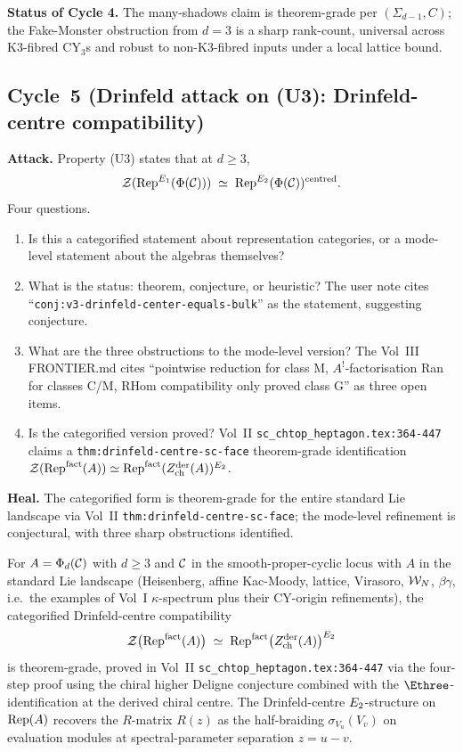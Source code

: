 \medskip
\noindent\textbf{Status of Cycle 4.} The many-shadows claim is theorem-grade
per $(\Sigma_{d-1}, C)$; the Fake-Monster obstruction from $d = 3$ is a
sharp rank-count, universal across K3-fibred CY$_3$s and robust to
non-K3-fibred inputs under a local lattice bound.

\subsection*{Cycle~5 (Drinfeld attack on (U3): Drinfeld-centre compatibility)}

\textbf{Attack.} Property (U3) states that at $d \ge 3$,
\[
  \mathcal{Z}(\mathrm{Rep}^{E_1}(\Phi(\mathcal{C}))) \;\simeq\; \mathrm{Rep}^{E_2}(\Phi(\mathcal{C}))^{\mathrm{centred}}.
\]
Four questions.
\begin{enumerate}
\item[Q1.] Is this a categorified statement about representation
categories, or a mode-level statement about the algebras themselves?
\item[Q2.] What is the status: theorem, conjecture, or heuristic? The
user note cites ``\texttt{conj:v3-drinfeld-center-equals-bulk}'' as the
statement, suggesting conjecture.
\item[Q3.] What are the three obstructions to the mode-level version?
The Vol~III FRONTIER.md cites ``pointwise reduction for class M,
$A^!$-factorisation Ran for classes C/M, RHom compatibility only proved
class G'' as three open items.
\item[Q4.] Is the categorified version proved? Vol~II
\texttt{sc\_chtop\_heptagon.tex:364-447} claims a
\texttt{thm:drinfeld-centre-sc-face} theorem-grade identification
$\mathcal{Z}(\mathrm{Rep}^{\mathrm{fact}}(A)) \simeq \mathrm{Rep}^{\mathrm{fact}}(Z^{\mathrm{der}}_{\mathrm{ch}}(A))^{E_2}$.
\end{enumerate}

\textbf{Heal.} The categorified form is theorem-grade for the entire
standard Lie landscape via Vol~II \texttt{thm:drinfeld-centre-sc-face};
the mode-level refinement is conjectural, with three sharp obstructions
identified.

\begin{theorem}
\ClaimStatusProvedElsewhere\label{wn:thm:agent5-categorified-drinfeld-centre}
For $A = \Phi_d(\mathcal{C})$ with $d \ge 3$ and $\mathcal{C}$ in the
smooth-proper-cyclic locus with
$A$ in the standard Lie landscape (Heisenberg, affine Kac-Moody,
lattice, Virasoro, $\mathcal{W}_N$, $\beta\gamma$, i.e.\ the examples of
Vol~I $\kappa$-spectrum plus their CY-origin refinements), the
categorified Drinfeld-centre compatibility
\[
  \mathcal{Z}\bigl(\mathrm{Rep}^{\mathrm{fact}}(A)\bigr) \;\simeq\;
  \mathrm{Rep}^{\mathrm{fact}}\bigl(Z^{\mathrm{der}}_{\mathrm{ch}}(A)\bigr)^{E_2}
\]
is theorem-grade, proved in Vol~II \texttt{sc\_chtop\_heptagon.tex:364-447}
via the four-step proof using the chiral higher Deligne conjecture
combined with the $\Ethree$-identification at the derived chiral centre.
The Drinfeld-centre $E_2$-structure on $\mathrm{Rep}(A)$ recovers the
$R$-matrix $R(z)$ as the half-braiding $\sigma_{V_u}(V_v)$ on
evaluation modules at spectral-parameter separation $z = u - v$.
\end{theorem}

